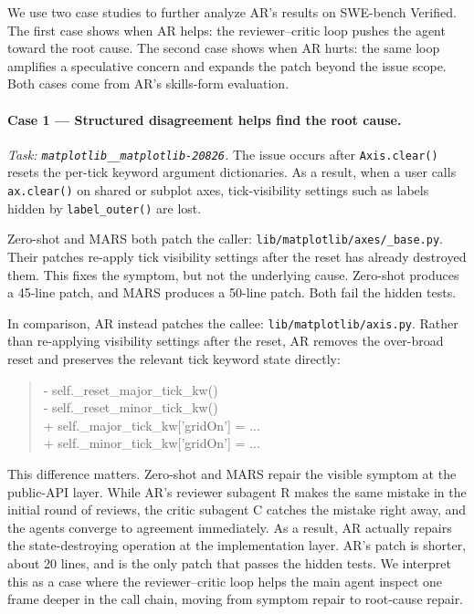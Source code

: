 \documentclass{article}
\begin{document}
We use two case studies to further analyze AR's results on SWE-bench Verified. The
first case shows when AR helps: the reviewer--critic loop pushes the
agent toward the root cause. The second case shows when AR hurts: the
same loop amplifies a speculative concern and expands the patch beyond
the issue scope. Both cases come from AR's skills-form evaluation.

\paragraph{Case 1 — Structured disagreement helps find the root cause.}
\textit{Task: \texttt{matplotlib\_\_matplotlib-20826}.}
The issue occurs after \texttt{Axis.clear()} resets the per-tick keyword
argument dictionaries. As a result, when a user calls
\texttt{ax.clear()} on shared or subplot axes, tick-visibility settings
such as labels hidden by \texttt{label\_outer()} are lost.

Zero-shot and MARS both patch the caller:
\texttt{lib/matplotlib/axes/\_base.py}. Their patches re-apply tick
visibility settings after the reset has already destroyed them. This
fixes the symptom, but not the underlying cause. Zero-shot produces a
45-line patch, and MARS produces a 50-line patch. Both fail the hidden
tests.

In comparison, AR instead patches the callee:
\texttt{lib/matplotlib/axis.py}. Rather than re-applying visibility
settings after the reset, AR removes the over-broad reset and preserves
the relevant tick keyword state directly:

\begin{quote}\small\ttfamily
- self.\_reset\_major\_tick\_kw() \\
- self.\_reset\_minor\_tick\_kw() \\
+ self.\_major\_tick\_kw['gridOn'] = ... \\
+ self.\_minor\_tick\_kw['gridOn'] = ...
\end{quote}

This difference matters. Zero-shot and MARS repair the visible symptom
at the public-API layer. While AR's reviewer subagent R makes the same mistake in the initial round of reviews, the critic subagent C catches the mistake right away, and the agents converge to agreement immediately. As a result, AR actually repairs the state-destroying operation at
the implementation layer. AR's patch is shorter, about 20 lines, and is
the only patch that passes the hidden tests. We interpret this as a case
where the reviewer--critic loop helps the main agent inspect one frame
deeper in the call chain, moving from symptom repair to root-cause
repair.
\end{document}
